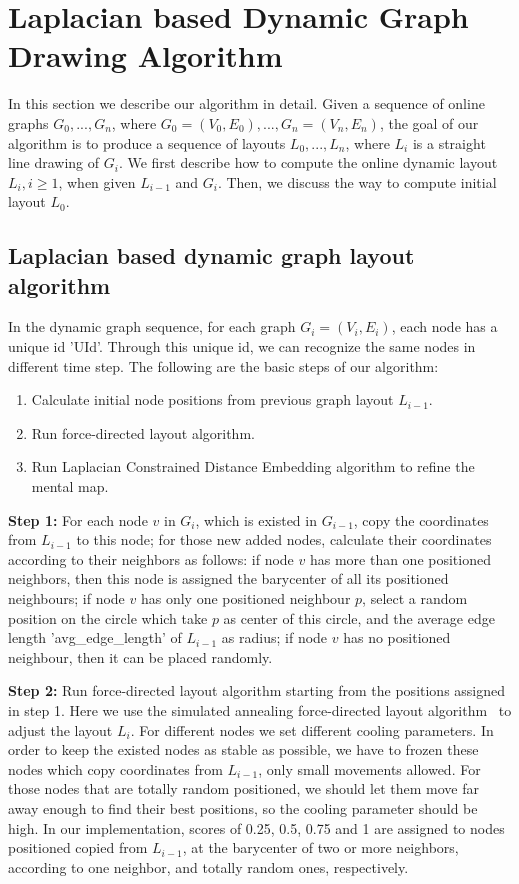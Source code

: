 \section{Laplacian based Dynamic Graph Drawing Algorithm}
In this section we describe our algorithm in detail. 
Given a sequence of online graphs $G_{0}, ..., G_{n}$, where $G_{0} = (V_{0}, E_{0}), ..., G_{n} = (V_{n}, E_{n})$,
the goal of our algorithm is to produce a sequence of layouts $L_{0}, ..., L_{n}$, where $L_{i}$ is a straight line
drawing of $G_{i}$. We first describe how to compute the online dynamic layout $L_{i}, i \ge 1$, when given $L_{i-1}$
and $G_{i}$. Then, we discuss the way to compute initial layout $L_{0}$.

\subsection{Laplacian based dynamic graph layout algorithm}
In the dynamic graph sequence, for each graph $G_{i} = (V_{i}, E_{i})$, each node has a unique id 'UId'.
Through this unique id, we can recognize the same nodes in different time step.
The following are the basic steps of our algorithm:
\begin{enumerate}
    \item Calculate initial node positions from previous graph layout $L_{i-1}$.
    \item Run force-directed layout algorithm.
    \item Run Laplacian Constrained Distance Embedding algorithm to refine the mental map.
\end{enumerate}

\textbf{Step 1:} For each node $v$ in $G_{i}$, which is existed in $G_{i-1}$, copy
the coordinates from $L_{i-1}$ to this node; for those new added nodes, calculate their coordinates
according to their neighbors as follows: if node $v$ has more than one positioned neighbors, then 
this node is assigned the barycenter of all its positioned neighbours; if node $v$ has only one positioned
neighbour $p$, select a random position on the circle which take $p$ as center of this circle, and the average edge length 'avg_edge_length' of $L_{i-1}$ as radius; if node $v$ has no positioned neighbour, then it can be placed
randomly.

\textbf{Step 2:} Run force-directed layout algorithm starting from the positions assigned in step 1. Here we use 
the simulated annealing force-directed layout algorithm~\cite{Davidson:1996:ATG} to adjust the layout $L_{i}$. For
different nodes we set different cooling parameters. In order to keep the existed nodes as stable as possible, we
have to frozen these nodes which copy coordinates from $L_{i-1}$, only small movements allowed. For those nodes that
are totally random positioned, we should let them move far away enough to find their best positions, so the cooling 
parameter should be high. In our implementation, scores of 0.25, 0.5, 0.75 and 1 are assigned to nodes positioned
copied from $L_{i-1}$, at the barycenter of two or more neighbors, according to one neighbor, and totally random ones,
respectively. 

